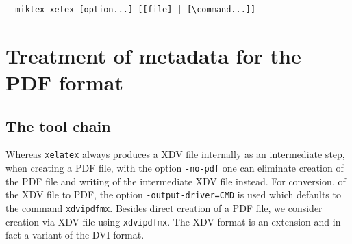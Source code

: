 \documentclass[a4paper, english]{article}%
\newcommand{\lualatex}{\texttt{lualatex}}
\newcommand{\xelatex}{\texttt{xelatex}}
\newcommand{\texlive}{\TeX~Live}
\newcommand{\miktex}{MiKTeX}
\begin{document}


  
  
  

\begin{verbatim}
  miktex-xetex [option...] [[file] | [\command...]]
\end{verbatim}







\section{Treatment of metadata for the PDF format}\label{sec:metaPDF}

\subsection{The tool chain}\label{subsec:toolchain}

Whereas \xelatex{} always produces a XDV file internally as an intermediate step, 
when creating a PDF file, with the option \texttt{-no-pdf} 
one can eliminate creation of the PDF file and writing of the intermediate XDV file instead. 
For conversion, of the XDV file to PDF, the option \texttt{-output-driver=CMD} 
is used which defaults to the command \texttt{xdvipdfmx}. 
Besides direct creation of a PDF file, 
we consider creation via XDV file using \texttt{xdvipdfmx}. 
The XDV format is an extension and in fact a variant of the DVI format. 
\end{document}
